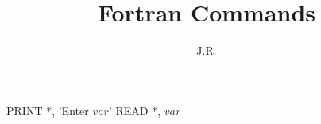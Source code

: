 \documentclass{article}
\begin{document}
\title{Fortran Commands}
\author{J.R.}
\maketitle

PRINT *, 'Enter $var$'
READ *, $var$
\end{document}
